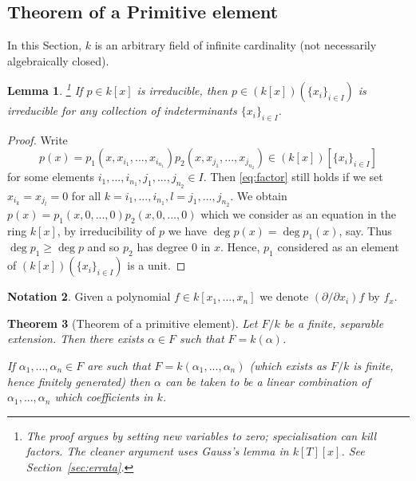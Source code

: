 \documentclass[12pt]{article}
\theoremstyle{plain}
\newtheorem{thm}{Theorem}[subsection] %
\newtheorem{lemma}[thm]{Lemma}
\theoremstyle{definition}
\newtheorem{notation}[thm]{Notation}
\begin{document}
\subsection{Theorem of a Primitive element}
In this Section, $k$ is an arbitrary field of infinite cardinality (not necessarily algebraically closed).
\begin{lemma}
\label{lem:irred_in_ext}\footnote{The proof argues by setting new variables to zero; specialisation can kill factors. The cleaner argument uses Gauss's lemma in $k[T][x]$. See Section~\ref{sec:errata}.}
If $p \in k[x]$ is irreducible, then $p \in (k[x])(\lbrace x_i\rbrace_{i \in I})$ is irreducible for any collection of indeterminants $\lbrace x_i \rbrace_{i \in I}$.
\end{lemma}
\begin{proof}
Write
\begin{equation}\label{eq:factor}
p(x) = p_1(x,x_{i_1},...,x_{i_{n_1}})p_2(x,x_{j_1},...,x_{j_{{n_2}}}) \in (k[x])[\lbrace x_i\rbrace_{i \in I}]    
\end{equation}
for some elements $i_{1},...,i_{n_1},j_1,...,j_{n_2} \in I$. Then \eqref{eq:factor} still holds if we set $x_{i_k} = x_{j_l} = 0$ for all $k= i_1,...,i_{n_1}, l = j_1,...,j_{n_2}$. We obtain $p(x) = p_1(x,0,...,0)p_2(x,0,...,0)$ which we consider as an equation in the ring $k[x]$, by irreducibility of $p$ we have $\operatorname{deg}p(x) = \operatorname{deg}p_1(x)$, say. Thus $\operatorname{deg}p_1 \geq \operatorname{deg}p$ and so $p_2$ has degree $0$ in $x$. Hence, $p_1$ considered as an element of $(k[x])(\lbrace x_i\rbrace_{i \in I})$ is a unit.
\end{proof}
\begin{notation}
Given a polynomial $f \in k[x_1,...,x_n]$ we denote $(\partial/\partial x_i)f$ by $f_{x}$.
\end{notation}
\begin{thm}[Theorem of a primitive element]
\label{thm:primitive_element}
Let $F/k$ be a finite, separable extension. Then there exists $\alpha \in F$ such that $F = k(\alpha)$.

If $\alpha_1,...,\alpha_n \in F$ are such that $F = k(\alpha_1,...,\alpha_n)$ (which exists as $F/k$ is finite, hence finitely generated) then $\alpha$ can be taken to be a linear combination of $\alpha_1,...,\alpha_n$ which coefficients in $k$.
\end{thm}
\end{document}
